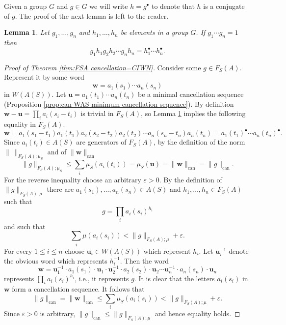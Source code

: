 \documentclass[12pt]{amsart}
\newtheorem{lemma}[prop]{Lemma}
\theoremstyle{definition}
\newcommand{\B}[1]{\mathbf{#1}}
\def\can{\text{can}}
\def\Free{F}
\begin{document}
Given a group $G$ and $g \in G$ we will write $h=g^\bullet$ to denote that $h$ is a conjugate of $g$.
The proof of the next lemma is left to the reader.

\begin{lemma}\label{lem:bullets 1}
Let $g_1, \dots, g_n$ and $h_1, \dots, h_n$ be elements in a group $G$.
If $g_1 \cdots g_n =1$ then 
\[
g_1h_1g_2 h_2 \cdots g_n h_n = h_1^\bullet \cdots h_n^\bullet.
\]
\end{lemma}



\begin{proof}[Proof of Theorem \ref{thm:FSA cancellation=CIWN}]
Consider some $g \in \Free_S(A)$.
Represent it by some word
\[
\B w = a_1(s_1) \cdots a_n(s_n)
\]
in $W(A(S))$.
Let $\B u= a_1(t_1) \cdots a_n(t_n)$ be a minimal cancellation sequence (Proposition \ref{prop:can-WAS minimum cancellation sequence}).
By definition $\B w - \B u = \prod_i a_i(s_i-t_i)$ is trivial in $\Free_S(A)$, so Lemma \ref{lem:bullets 1} implies the following equality in $\Free_S(A)$.
\[
\B w = 
a_1(s_1-t_1) a_1(t_1) a_2(s_2-t_2) a_2(t_2) \cdots a_n(s_n-t_n) a_n(t_n) 
= 
a_1(t_1)^\bullet \cdots a_n(t_n)^\bullet.
\]
Since $a_i(t_i) \in A(S)$ are generators of $\Free_S(A)$, by the definition of the norm $\| \ \|_{\Free_S(A);\mu_S}$ and of $\| \B w\|_{\can}$
\[
\| g \|_{\Free_S(A);\mu_S} \leq \sum_i \mu_S(a_i(t_i)) = \mu_S(\B u) = \| \B w\|_{\can} = \| g\|_{\can}.
\]
For the reverse inequality choose an arbitrary $\varepsilon>0$.
By the definition of $\| g\|_{\Free_S(A);\mu}$ there are $a_1(s_1), \dots , a_n(s_n) \in A(S)$ and $h_1 ,\dots, h_n \in \Free_S(A)$ such that
\[
g= \prod_i a_i(s_i)^{h_i}
\]
and such that
\[
\sum_i \mu(a_i(s_i)) < \| g\|_{\Free_S(A);\mu} + \varepsilon.
\]
For every $1 \leq i \leq n$ choose $\B u_i \in W(A(S))$ which represent $h_i$.
Let $\B u_i^{-1}$ denote the obvious word which represents $h_i^{-1}$.
Then the word
\[
\B w = \B u_1^{-1} \cdot a_1(s_1) \cdot \B u_1 \cdot \B u_2^{-1} \cdot a_2(s_2) \cdot \B u_2 \cdots \B u_n^{-1} \cdot a_n(s_n) \cdot \B u_n 
\]
represents $\prod_i a_i(s_i)^{h_i}$, i.e., it represents $g$.
It is clear that the letters $a_i(s_i)$ in $\B w$ form a cancellation sequence.
It follows that
\[
\| g\|_{\can} = \| \B w\|_{\can} \leq \sum_i \mu_S(a_i(s_i)) < \|g\|_{\Free_S(A);\mu} + \varepsilon.
\]
Since $\varepsilon>0$ is arbitrary, $\| g\|_{\can} \leq \|g\|_{\Free_S(A);\mu}$ and hence equality holds.
\end{proof}
\end{document}
